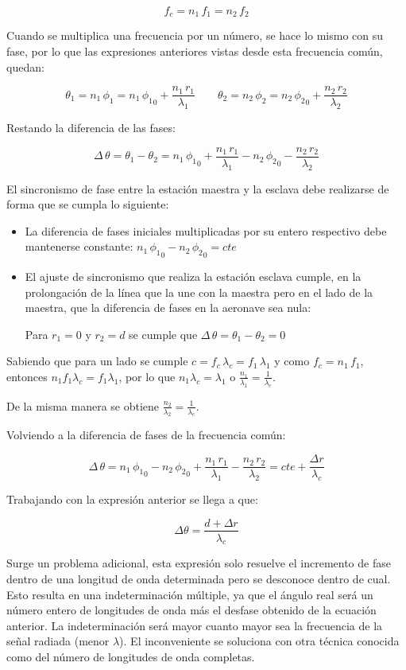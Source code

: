 \begin{description}
\[
f_c = n_1\,f_1 = n_2\,f_2
\]

Cuando se multiplica una frecuencia por un n\'umero, se hace lo mismo con su fase, por lo que las expresiones anteriores vistas desde esta frecuencia com\'un, quedan:

\[
\theta_1 = n_1\,\phi_1 = n_1\,{\phi_1}_0 + \displaystyle \frac{n_1\,r_1}{\lambda_1} \qquad
\theta_2 = n_2\,\phi_2 = n_2\,{\phi_2}_0 + \displaystyle \frac{n_2\,r_2}{\lambda_2} 
\]

Restando la diferencia de las fases:

\[
\Delta\,\theta = \theta_1-\theta_2 = n_1\,{\phi_1}_0 + \displaystyle \frac{n_1\,r_1}{\lambda_1} -  n_2\,{\phi_2}_0 - \displaystyle \frac{n_2\,r_2}{\lambda_2} 
\]

El sincronismo de fase entre la estaci\'on maestra y la esclava debe realizarse de forma que se cumpla lo siguiente:

\begin{itemize}
\item La diferencia de fases iniciales multiplicadas por su entero respectivo debe mantenerse constante: $n_1\,{\phi_1}_0- n_2\,{\phi_2}_0= cte$

\item El ajuste de sincronismo que realiza la estaci\'on esclava cumple, en la prolongaci\'on de la l\'inea que la une con la maestra pero en el lado de la maestra, que la diferencia de fases en la aeronave sea nula: 

Para $r_1=0$ y $r_2=d$ se cumple que $\Delta\,\theta = \theta_1-\theta_2 =0$

\end{itemize}

Sabiendo que para un lado se cumple $c = f_c\,\lambda_c = f_1\,\lambda_1$ y como $f_c=n_1\,f_1$, entonces $n_1f_1\lambda_c = f_1\lambda_1$, por lo que $n_1\lambda_c=\lambda_1$ o $\displaystyle \frac{n_1}{\lambda_1}=\frac{1}{\lambda_c}$.

De la misma manera se obtiene $\displaystyle \frac{n_2}{\lambda_2}=\frac{1}{\lambda_c}$.

Volviendo a la diferencia de fases de la frecuencia com\'un:

\[
\Delta\,\theta = n_1\,{\phi_1}_0- n_2\,{\phi_2}_0 +  \displaystyle \frac{n_1\,r_1}{\lambda_1}  - \displaystyle \frac{n_2\,r_2}{\lambda_2}= cte + \frac{\Delta r}{\lambda_c}
\]

Trabajando con la expresi\'on anterior se llega a que:

\[
\Delta \theta = \displaystyle \frac{d+\Delta r}{\lambda_c}
\]

Surge un problema adicional, esta expresi\'on solo resuelve el incremento de fase dentro de una longitud de onda determinada pero se desconoce dentro de cual. 
Esto resulta en una indeterminaci\'on m\'ultiple, ya que el \'angulo real ser\'a un n\'umero entero de longitudes de onda m\'as el desfase obtenido de la ecuaci\'on anterior. 
La indeterminaci\'on ser\'a mayor cuanto mayor sea la frecuencia de la se\~nal radiada (menor $\lambda$). 
El inconveniente se soluciona con otra t\'ecnica conocida como del n\'umero de longitudes de onda completas.


\end{description}


